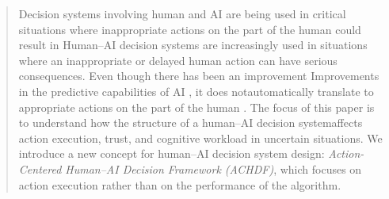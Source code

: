 \documentclass[journal]{IEEEtran}
\theoremstyle{plain}
\theoremstyle{definition}
\providecommand{\DIFaddtex}[1]{{\protect\color{blue} \sf #1}} %
\providecommand{\DIFdeltex}[1]{{\protect\color{red} \scriptsize #1}} %
\providecommand{\DIFaddbegin}{} %
\providecommand{\DIFaddend}{} %
\providecommand{\DIFdelbegin}{} %
\providecommand{\DIFdelend}{} %
\providecommand{\DIFadd}[1]{\texorpdfstring{\DIFaddtex{#1}}{#1}} %
\providecommand{\DIFdel}[1]{\texorpdfstring{\DIFdeltex{#1}}{}} %
\newcommand{\DIFscaledelfig}{0.5}
\newlength{\DIFdelgraphicswidth} %
\newlength{\DIFdelgraphicsheight} %
\newcommand{\DIFaddincludegraphics}[2][]{{\color{blue}\fbox{\DIFOincludegraphics[#1]{#2}}}} %
\newcommand{\DIFdelincludegraphics}[2][]{%
\sbox{\DIFdelgraphicsbox}{\DIFOincludegraphics[#1]{#2}}%
\settoboxwidth{\DIFdelgraphicswidth}{\DIFdelgraphicsbox} %
\settoboxtotalheight{\DIFdelgraphicsheight}{\DIFdelgraphicsbox} %
\scalebox{\DIFscaledelfig}{%
\parbox[b]{\DIFdelgraphicswidth}{\usebox{\DIFdelgraphicsbox}\\[-\baselineskip] \rule{\DIFdelgraphicswidth}{0em}}\llap{\resizebox{\DIFdelgraphicswidth}{\DIFdelgraphicsheight}{%
\setlength{\unitlength}{\DIFdelgraphicswidth}%
\begin{picture}(1,1)%
\thicklines\linethickness{2pt} %
{\color[rgb]{1,0,0}\put(0,0){\framebox(1,1){}}}%
{\color[rgb]{1,0,0}\put(0,0){\line( 1,1){1}}}%
{\color[rgb]{1,0,0}\put(0,1){\line(1,-1){1}}}%
\end{picture}%
}\hspace*{3pt}}} %
} %
\DeclareRobustCommand{\DIFaddbegin}{\DIFOaddbegin \let\includegraphics\DIFaddincludegraphics} %
\DeclareRobustCommand{\DIFaddend}{\DIFOaddend \let\includegraphics\DIFOincludegraphics} %
\DeclareRobustCommand{\DIFdelbegin}{\DIFOdelbegin \let\includegraphics\DIFdelincludegraphics} %
\DeclareRobustCommand{\DIFdelend}{\DIFOaddend \let\includegraphics\DIFOincludegraphics} %
\begin{document}
    \begin{abstract}
        \DIFdelbegin \DIFdel{Decision systems involving human and AI are being used in critical situations where inappropriate actions on the part of the human could result in }\DIFdelend \DIFaddbegin \DIFadd{Human--AI decision systems are increasingly used in situations where an inappropriate or delayed human action can have }\DIFaddend serious consequences. \DIFdelbegin \DIFdel{Even though there has been an improvement }\DIFdelend \DIFaddbegin \DIFadd{Improvements }\DIFaddend in the predictive \DIFdelbegin \DIFdel{capabilities of AI , it does notautomatically translate to appropriate actions on the part of the human . The focus of this paper is to understand how the structure of a human--AI decision systemaffects action execution, trust, and cognitive workload in uncertain situations.
        We introduce a new concept for human--AI decision system design: \emph{Action-Centered Human--AI Decision Framework (ACHDF)}, which focuses on action execution rather than on the performance of the algorithm.
}
\end{abstract}
\end{document}
